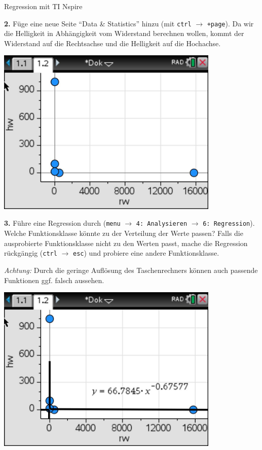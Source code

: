 \begin{zsfg}{Regression mit TI Nspire}
	
	\begin{minipage}[c][4.5cm][t]{0.48\textwidth}
		\textbf{2.} Füge eine neue Seite \enquote{Data \& Statistics} hinzu (mit \texttt{ctrl} $\rightarrow$ \texttt{+page}). Da wir die Helligkeit in Abhängigkeit vom Widerstand berechnen wollen, kommt der Widerstand auf die Rechtsachse und die Helligkeit auf die Hochachse.
	\end{minipage}
	\hfill
	\begin{minipage}[c][4.5cm][t]{0.48\textwidth}
		\centering
		\includegraphics[width=0.8\textwidth]{./pics/RegressionLDR-TI-2.jpg}
	\end{minipage}
	
	\begin{minipage}[c][6cm][t]{0.48\textwidth}
		\textbf{3.} Führe eine Regression durch (\texttt{menu} $\rightarrow$ \texttt{4: Analysieren} $\rightarrow$ \texttt{6: Regression}). Welche Funktionsklasse könnte zu der Verteilung der Werte passen? Falls die ausprobierte Funktionsklasse nicht zu den Werten passt, mache die Regression rückgängig (\texttt{ctrl} $\rightarrow$ \texttt{esc}) und probiere eine andere Funktionsklasse.
		
		\emph{Achtung:} Durch die geringe Auflösung des Taschenrechners können auch passende Funktionen ggf. falsch aussehen.
	\end{minipage}
	\hfill
	\begin{minipage}[c][6cm][t]{0.48\textwidth}
		\centering
		\includegraphics[width=0.8\textwidth]{./pics/RegressionLDR-TI-3.jpg}
	\end{minipage}


\end{zsfg}
